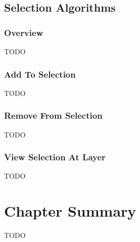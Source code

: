 \subsection{Selection Algorithms}

\subsubsection{Overview}

TODO

\subsubsection{Add To Selection}

TODO

\subsubsection{Remove From Selection}

TODO

\subsubsection{View Selection At Layer}

TODO

\section{Chapter Summary}

TODO
